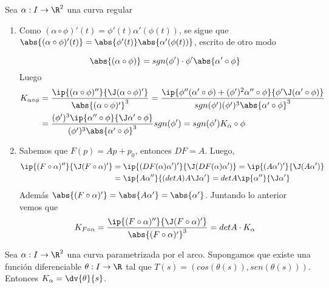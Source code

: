 \documentclass{article}
\begin{document}
\begin{dem} Sea $\alpha: I\to\R^{2}$ una curva regular
    \begin{enumerate}
        \item Como $(\alpha\circ\phi)'(t)=\phi'(t)\alpha'(\phi(t))$, se sigue que 
        $\abs{(\alpha\circ\phi)'(t)}=\abs{\phi'(t)}\abs{\alpha'(\phi(t))}$, escrito de otro modo
        
        \begin{equation*}
            \abs{(\alpha\circ\phi)}=sgn(\phi')\cdot\phi'\abs{\alpha'\circ\phi}
        \end{equation*}
        Luego
        \begin{align*}
            K_{\alpha\circ\phi} &= \frac{\ip{(\alpha\circ\phi)''}{\J(\alpha\circ\phi)'}}
            {\abs{(\alpha\circ\phi)'}^{3}}=
            \frac{\ip{\phi''(\alpha'\circ\phi)+(\phi')^{2}\alpha''\circ\phi}
            {\phi'\J(\alpha'\circ\phi)}}{sgn(\phi')(\phi')^{3}\abs{\alpha'\circ\phi}^{3}} \\
            &= \frac{(\phi')^{3}\ip{\alpha''\circ\phi}{\J\alpha'\circ\phi}}
            {(\phi')^{3}\abs{\alpha'\circ\phi}^{3}}sgn(\phi')=sgn(\phi')K_{\alpha}\circ\phi
        \end{align*}
        
        \item Sabemos que $F(p)=Ap+p_{0}$, entonces $DF=A$. Luego,
        \begin{align*}
            \ip{(F\circ\alpha)''}{\J(F\circ\alpha)'} &= \ip{(DF(\alpha)\alpha')'}
            {\J(DF(\alpha)\alpha')}=\ip{(A\alpha')'}{\J(A\alpha')} \\
            &= \ip{A\alpha''}{(detA)A\J\alpha'}=detA\ip{\alpha''}{\J\alpha'}
        \end{align*}
        Además $\abs{(F\circ\alpha)'}=\abs{A\alpha'}=\abs{\alpha'}$. Juntando lo anterior vemos que
        \begin{equation*}
            K_{F\circ\alpha}=\frac{\ip{(F\circ\alpha)''}{\J(F\circ\alpha)'}}
            {\abs{(F\circ\alpha)'}^{3}} = detA\cdot K_{\alpha}
        \end{equation*}
    \end{enumerate}
\end{dem}

\begin{prop}
    Sea $\alpha: I\to\R^{2}$ una curva parametrizada por el arco. Supongamos que existe una función
    diferenciable $\theta: I\to\R$ tal que $T(s)=(cos(\theta(s)),sen(\theta(s)))$. Entonces 
    $K_{\alpha}=\dv{\theta}{s}$.
\end{prop}
\end{document}

